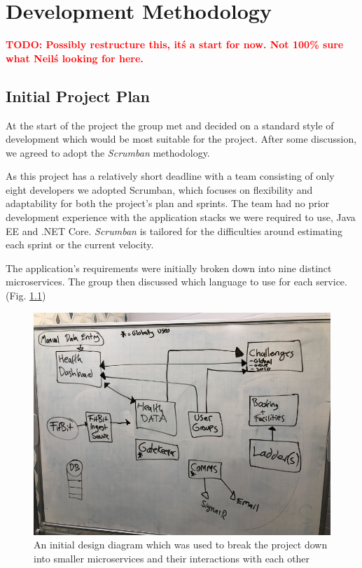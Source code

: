 \chapter{Development Methodology}

\textcolor{red}{\textbf{TODO: Possibly restructure this, it\'s a start for now. Not 100\% sure what Neil\'s looking for here.}}

\section{Initial Project Plan}
\par
At the start of the project the group met and decided on a standard style of development which would be most suitable for the project. After some discussion, we agreed to adopt the \textit{Scrumban}\cite{scrumban} methodology. 

\par
As this project has a relatively short deadline with a team consisting of only eight developers we adopted Scrumban, which focuses on flexibility and adaptability for both the project's plan and sprints. 
The team had no prior development experience with the application stacks we were required to use, Java EE and .NET Core. \textit{Scrumban} is tailored for the difficulties around estimating each sprint or the current velocity.

\par
The application's requirements were initially broken down into nine distinct microservices. The group then discussed which language to use for each service. (Fig. \ref{fig:initial_spec_chart})

\begin{figure}[H]
    \centering
    \includegraphics[width=\textwidth]{Images/Initial_Spec_Chart.jpg}
    \caption{An initial design diagram which was used to break the project down into smaller microservices and their interactions with each other}
    \label{fig:initial_spec_chart}
\end{figure}

